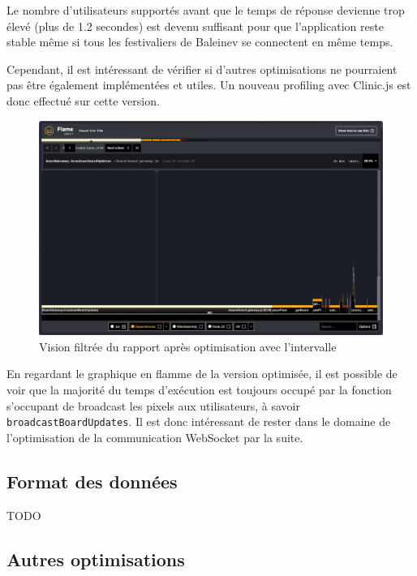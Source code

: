 Le nombre d'utilisateurs supportés avant que le temps de réponse devienne trop élevé (plus de 1.2 secondes) est devenu suffisant pour que l'application reste stable même si tous les festivaliers de Baleinev se connectent en même temps.

Cependant, il est intéressant de vérifier si d'autres optimisations ne pourraient pas être également implémentées et utiles. Un nouveau profiling avec Clinic.js est donc effectué sur cette version.


\begin{figure}[H]
  \centering
  \includegraphics[width=1\textwidth]{./assets/figures/flame/flame2-filtered.png}
  \caption{Vision filtrée du rapport après optimisation avec l'intervalle}
  \label{fig:flame2-filtered}
\end{figure}

En regardant le graphique en flamme de la version optimisée, il est possible de voir que la majorité du temps d'exécution est toujours occupé par la fonction s'occupant de broadcast les pixels aux utilisateurs, à savoir \texttt{broadcastBoardUpdates}. Il est donc intéressant de rester dans le domaine de l'optimisation de la communication WebSocket par la suite.

\subsection{Format des données}

TODO

\subsection{Autres optimisations}

